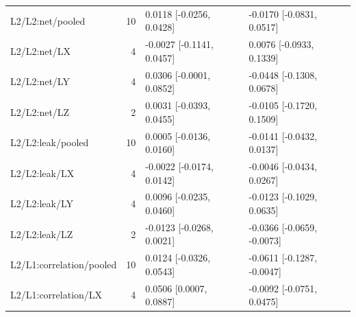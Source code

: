 \begin{longtable}{@{}p{1.8in}rl l@{}}
L2/\allowbreak L2:net/\allowbreak pooled & 10 & 0.0118 [-0.0256, 0.0428] & -0.0170 [-0.0831, 0.0517]\\
L2/\allowbreak L2:net/\allowbreak LX & 4 & -0.0027 [-0.1141, 0.0457] & 0.0076 [-0.0933, 0.1339]\\
L2/\allowbreak L2:net/\allowbreak LY & 4 & 0.0306 [-0.0001, 0.0852] & -0.0448 [-0.1308, 0.0678]\\
L2/\allowbreak L2:net/\allowbreak LZ & 2 & 0.0031 [-0.0393, 0.0455] & -0.0105 [-0.1720, 0.1509]\\
L2/\allowbreak L2:leak/\allowbreak pooled & 10 & 0.0005 [-0.0136, 0.0160] & -0.0141 [-0.0432, 0.0137]\\
L2/\allowbreak L2:leak/\allowbreak LX & 4 & -0.0022 [-0.0174, 0.0142] & -0.0046 [-0.0434, 0.0267]\\
L2/\allowbreak L2:leak/\allowbreak LY & 4 & 0.0096 [-0.0235, 0.0460] & -0.0123 [-0.1029, 0.0635]\\
L2/\allowbreak L2:leak/\allowbreak LZ & 2 & -0.0123 [-0.0268, 0.0021] & -0.0366 [-0.0659, -0.0073]\\
L2/\allowbreak L1:correlation/\allowbreak pooled & 10 & 0.0124 [-0.0326, 0.0543] & -0.0611 [-0.1287, -0.0047]\\
L2/\allowbreak L1:correlation/\allowbreak LX & 4 & 0.0506 [0.0007, 0.0887] & -0.0092 [-0.0751, 0.0475]\\

\end{longtable}
